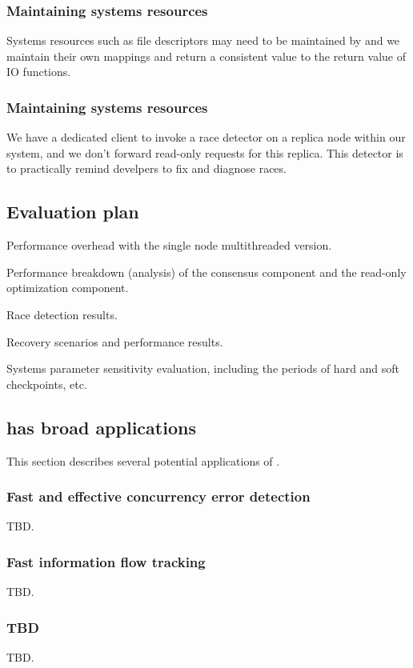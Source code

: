 \subsubsection{Maintaining systems resources} \label{sec:re-resource}
Systems resources such as file descriptors may need to be maintained by 
\msmr and we maintain their own mappings and return a consistent value to the 
return value of IO functions.

\subsubsection{Maintaining systems resources} \label{sec:rep-race}
We have a dedicated client to invoke a race detector on a replica node within our system, 
and we don't forward read-only requests for this replica. This detector is to 
practically remind develpers to fix and diagnose races.

\subsection{Evaluation plan} \label{sec:rep-eval}
Performance overhead with the single node multithreaded version.

Performance breakdown (analysis) of the consensus component and the read-only optimization component.

Race detection results.

Recovery scenarios and performance results.

Systems parameter sensitivity evaluation, including the periods of hard and soft checkpoints, etc.


\subsection{\msmr has broad applications} \label{sec:rep-apps}

This section describes several potential applications of \msmr.

\subsubsection{Fast and effective concurrency error detection} \label{sec:rep-races} 
TBD.

\subsubsection{Fast information flow tracking} \label{sec:rep-ift}
TBD.

\subsubsection{TBD} \label{sec:rep-apps-tbd}
TBD.

